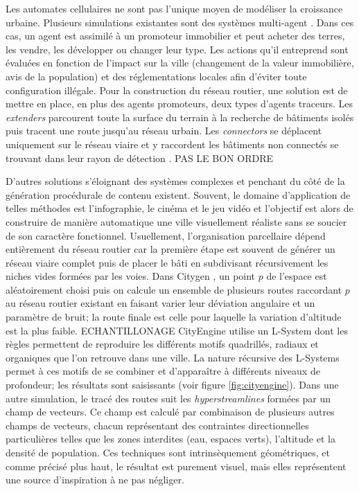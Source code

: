 \documentclass[12pt]{article}
\begin{document}
Les automates cellulaires ne sont pas l'unique moyen de modéliser la
croissance urbaine. Plusieurs simulations existantes sont des systèmes
multi-agent \cite{Lechner2003,Lechner2004}. Dans ces cas, un agent est
assimilé à un promoteur immobilier et peut acheter des terres, les
vendre, les développer ou changer leur type. Les actions qu'il
entreprend sont évaluées en fonction de l'impact sur la ville
(changement de la valeur immobilière, avis de la population) et des
réglementations locales afin d'éviter toute configuration illégale.
Pour la construction du réseau routier, une solution est de mettre en
place, en plus des agents promoteurs, deux types d'agents
traceurs. Les \textit{extenders} parcourent toute la surface du
terrain à la recherche de bâtiments isolés puis tracent une route
jusqu'au réseau urbain. Les \textit{connectors} se déplacent
uniquement sur le réseau viaire et y raccordent les bâtiments non
connectés se trouvant dans leur rayon de détection
\cite{Lechner2003}. PAS LE BON ORDRE

D'autres solutions s'éloignant des systèmes complexes et penchant du
côté de la génération procédurale de contenu existent. Souvent, le
domaine d'application de telles méthodes est l'infographie, le cinéma
et le jeu vidéo et l'objectif est alors de construire de manière
automatique une ville visuellement réaliste sans se soucier de son
caractère fonctionnel. Usuellement, l'organisation parcellaire dépend
entièrement du réseau routier car la première étape est souvent de
générer un réseau viaire complet puis de placer le bâti en subdivisant
récursivement les niches vides formées par les voies. Dans Citygen
\cite{Kelly2006b}, un point $p$ de l'espace est aléatoirement choisi
puis on calcule un ensemble de plusieurs routes raccordant $p$ au
réseau routier existant en faisant varier leur déviation angulaire et
un paramètre de bruit; la route finale est celle pour laquelle la
variation d'altitude est la plus faible. ECHANTILLONAGE CityEngine
\cite{Parish2001} utilise un L-System dont les règles permettent de
reproduire les différents motifs quadrillés, radiaux et organiques que
l'on retrouve dans une ville. La nature récursive des L-Systems permet
à ces motifs de se combiner et d'apparaître à différents niveaux de
profondeur; les résultats sont saisissants (voir figure
\ref{fig:cityengine}). Dans une autre simulation, le tracé des routes
suit les \textit{hyperstreamlines} \cite{Chen2008} formées par un
champ de vecteurs. Ce champ est calculé par combinaison de plusieurs
autres champs de vecteurs, chacun représentant des contraintes
directionnelles particulières telles que les zones interdites (eau,
espaces verts), l'altitude et la densité de population. Ces techniques
sont intrinsèquement géométriques, et comme précisé plus haut, le
résultat est purement visuel, mais elles représentent une source
d'inspiration à ne pas négliger.
\end{document}
